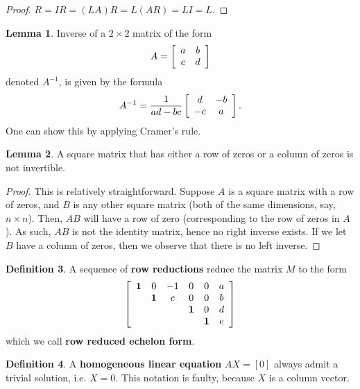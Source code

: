 \documentclass[11pt]{amsart} %
\theoremstyle{definition}
\newtheorem{definition}{Definition}[section]
\newtheorem{lemma}[definition]{Lemma}
\theoremstyle{definition}
\numberwithin{equation}{section}
\begin{document}
\begin{proof}
	$ R= IR = (LA)R = L(AR) = LI = L .$
\end{proof}

\begin{lemma}
	Inverse of a $2 \times 2$ matrix of the form
	$$ A = \left[ \begin{array}{c c }
	a & b \\
	c & d \\	
	\end{array} \right] $$
	denoted $A^{-1}$, is given by the formula
	$$ A^{-1} = \frac{1}{ad - bc} \left[ \begin{array}{c c }
	d & -b \\
	-c & a \\	
	\end{array} \right] .$$
	One can show this by applying Cramer's rule.
\end{lemma}

\begin{lemma}
	A square matrix that has either a row of zeros or a column of zeros is not invertible.
\end{lemma}

\begin{proof}
	This is relatively straightforward. Suppose $A$ is a square matrix with a row of zeros, and $B$ is any other square matrix (both of the same dimensions, say, $n \times n$). Then, $AB$ will have a row of zero (corresponding to the row of zeros in $A$). As such, $AB$ is not the identity matrix, hence no right inverse exists. If we let $B$ have a column of zeros, then we observe that there is no left inverse.
\end{proof}

\begin{definition}
	A sequence of \textbf{row reductions} reduce the matrix $M$ to the form
	$$ \left[ \begin{array}{c c c c c c }
	{\textbf{1}} & 0 & -1 & 0 & 0 & a \\
	& \textbf{1} & c & 0 & 0 &  b \\
 		&  & & \textbf{1} & 0  & d \\
			&  & & & \textbf{1} &  e \\
	\end{array} \right] $$
	which we call \textbf{row reduced echelon form}. 
\end{definition}

\begin{definition}
	A \textbf{homogeneous linear equation} $AX=[0]$ always admit a trivial solution, i.e. $X= 0$. This notation is faulty, because $X$ is a column vector.
\end{definition}
\end{document}
